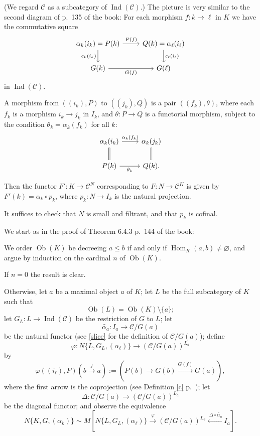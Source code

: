 \documentclass[12pt]{article}
\theoremstyle{remark}%
\newcommand{\n}{\noindent}
\newcommand{\C}{\mathcal C}
\newcommand{\p}{\varphi}
\newcommand{\xr}{\xrightarrow}
\DeclareMathOperator{\h}{Hom}
\DeclareMathOperator{\Ind}{Ind}
\DeclareMathOperator{\Ob}{Ob}
\begin{document}
\n(We regard $\C$ as a subcategory of $\Ind(\C)$.) The picture is very similar to the second diagram of p.~135 of the book: For each morphism $f:k\to\ell$ in $K$ we have the commutative square  
$$ 
\begin{tikzcd} 
\alpha_k(i_k)=P(k)\ar{r}{P(f)}\ar{d}[swap]{c_k(i_k)}&Q(k)=\alpha_\ell(i_\ell)\ar{d}{c_\ell(i_\ell)}\\ 
G(k)\ar{r}[swap]{G(f)}&G(\ell) 
\end{tikzcd} 
$$ 
in $\Ind(\C)$. 

A morphism from $((i_k),P)$ to $((j_k),Q)$ is a pair $((f_k),\theta)$, where each $f_k$ is a morphism $i_k\to j_k$ in $I_k$, and $\theta:P\to Q$ is a functorial morphism, subject to the condition $\theta_k=\alpha_k(f_k)$ for all $k$: 
$$ 
\begin{tikzcd} 
\alpha_k(i_k)\ar{r}{\alpha_k(f_k)}\ar[equal]{d}&\alpha_k(j_k)\ar[equal]{d}\\ 
P(k)\ar{r}[swap]{\theta_k}&Q(k).
\end{tikzcd} 
$$ 

Then the functor $F':K\to\C^N$ corresponding to $F:N\to\C^K$ is given by $F'(k)=\alpha_k\circ p_k$, where $p_k:N\to I_k$ is the natural projection. 

It suffices to check that $N$ is small and filtrant, and that $p_k$ is cofinal. 

We start as in the proof of Theorem 6.4.3 p.~144 of the book: 

We order $\Ob(K)$ be decreeing $a\le b$ if and only if $\h_K(a,b)\neq\varnothing$, and argue by induction on the cardinal $n$ of $\Ob(K)$. 

If $n=0$ the result is clear. 

Otherwise, let $a$ be a maximal object $a$ of $K$; let $L$ be the full subcategory of $K$ such that 
$$
\Ob(L)=\Ob(K)\setminus\{a\};
$$ 
let $G_L:L\to\Ind(\C)$ be the restriction of $G$ to $L$; let 
$$
\widetilde{\alpha_a}:I_a\to\C/G(a)
$$ 
be the natural functor (see \eqref{slice} for the definition of $\C/G(a)$); define  
$$ 
\p:N\{L,G_L,(\alpha_\ell)\}\to(\C/G(a))^{L_a} 
$$ 
by 
$$
\p((i_\ell),P)\left(b\xr f a\right):=\left(P(b)\to G(b)\xr{G(f)}G(a)\right),
$$
where the first arrow is the coprojection (see Definition \ref{c} p.~\pageref{c}); let 
$$
\Delta:\C/G(a)\to(\C/G(a))^{L_a}
$$ 
be the diagonal functor; and observe the equivalence 
$$ 
N\{K,G,(\alpha_k)\}\sim M\left[N\{L,G_L,(\alpha_\ell)\}\xrightarrow{\p}(\C/G(a))^{L_a}\xleftarrow{\ \Delta\circ\widetilde{\alpha_a}}I_a\right]. 
$$ 
\end{document}
